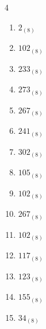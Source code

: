\begin{multicols}{4}
\begin{enumerate}
        \phantom{$=176$}

  \item $2_{(8)}$

        \phantom{$=2$}

  \item $102_{(8)}$

        \phantom{$=66$}

  \item $233_{(8)}$

        \phantom{$=155$}

  \item $273_{(8)}$

        \phantom{$=187$}

  \item $267_{(8)}$

        \phantom{$=183$}

  \item $241_{(8)}$

        \phantom{$=161$}

  \item $302_{(8)}$

        \phantom{$=194$}

  \item $105_{(8)}$

        \phantom{$=69$}

  \item $102_{(8)}$

        \phantom{$=66$}

  \item $267_{(8)}$

        \phantom{$=183$}

  \item $102_{(8)}$

        \phantom{$=66$}

  \item $117_{(8)}$

        \phantom{$=79$}

  \item $123_{(8)}$

        \phantom{$=83$}

\columnbreak %

  \item $155_{(8)}$

        \phantom{$=109$}

  \item $34_{(8)}$

        \phantom{$=28$}


\end{enumerate}
\end{multicols}
